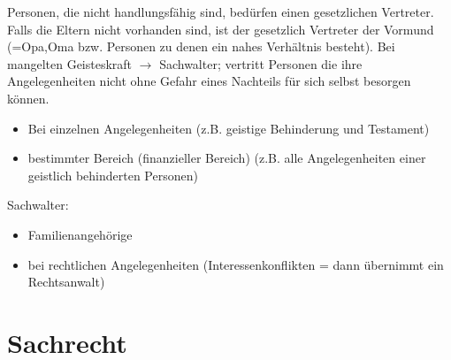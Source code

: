 \documentclass[a4paper]{report}
\begin{document}
Personen, die nicht handlungsfähig sind, bedürfen einen gesetzlichen Vertreter. Falls die Eltern nicht vorhanden sind, ist der gesetzlich Vertreter der Vormund (=Opa,Oma bzw. Personen zu denen ein nahes Verhältnis besteht). Bei mangelten Geisteskraft $\rightarrow$ Sachwalter; vertritt Personen die ihre Angelegenheiten nicht ohne Gefahr eines Nachteils für sich selbst besorgen können. 
\begin{itemize}
\item Bei einzelnen Angelegenheiten (z.B. geistige Behinderung und Testament)
\item bestimmter Bereich (finanzieller Bereich) (z.B. alle Angelegenheiten einer geistlich behinderten Personen)
\end{itemize}

Sachwalter:

\begin{itemize}
\item Familienangehörige
\item bei rechtlichen Angelegenheiten (Interessenkonflikten = dann übernimmt ein Rechtsanwalt)
\end{itemize}

\section{Sachrecht}
\end{document}
